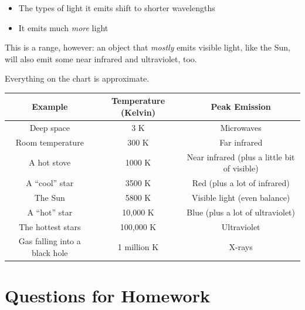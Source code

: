 \documentclass[12pt]{article}
\begin{document}
\begin{itemize}
	\item The types of light it emits shift to shorter wavelengths
	\item It emits much {\it more} light
\end{itemize}

This is a range, however: an object that {\it mostly} emits visible light, like the Sun, will also emit some near infrared and ultraviolet, too.

Everything on the chart is approximate. 

\begin{tabular}{|c|c|c|}
	\hline
	\bf Example & \bf Temperature (Kelvin) & \bf Peak Emission \\ \hline
	Deep space & 3 K & Microwaves \\ \hline
	Room temperature & 300 K & Far infrared \\ \hline
	A hot stove & 1000 K & Near infrared (plus a little bit of visible) \\ \hline
	A ``cool'' star & 3500 K & Red (plus a lot of infrared)\\ \hline
	The Sun & 5800 K & Visible light (even balance) \\ \hline
	A ``hot'' star & 10,000 K & Blue (plus a lot of ultraviolet) \\ \hline
	The hottest stars & 100,000 K & Ultraviolet \\ \hline
	Gas falling into a black hole & 1 million K & X-rays \\ \hline
\end{tabular}


\section{Questions for Homework}
\end{document}
